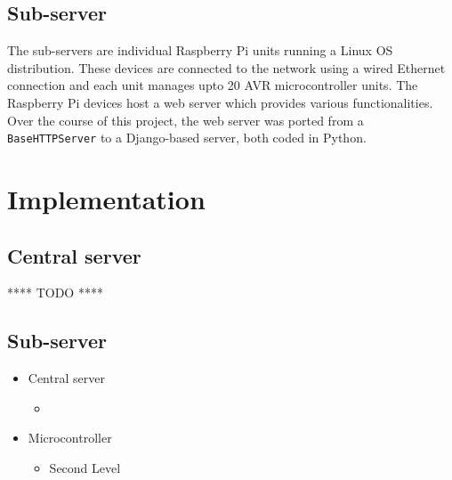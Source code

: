 \documentclass[letterpaper,11pt]{report}
\begin{document}
\section{Sub-server}
The sub-servers are individual Raspberry Pi units running a Linux OS distribution. These devices are connected to the network using a wired Ethernet connection and each unit manages upto 20 AVR microcontroller units. The Raspberry Pi devices host a web server which provides various functionalities. Over the course of this project, the web server was ported from a \verb|BaseHTTPServer| to a Django-based server, both coded in Python.

\newpage
\chapter{Implementation}\label{chapter:Implementation}
\onehalfspacing
\section{Central server}
\huge{**** TODO ****}
\section{Sub-server}
\begin{itemize}
    \item  Central server
    \begin{itemize}
        \item  
    \end{itemize}
    \item  Microcontroller
    \begin{itemize}
        \item  Second Level
    \end{itemize}
\end{itemize}


%

%
%


\end{document}
